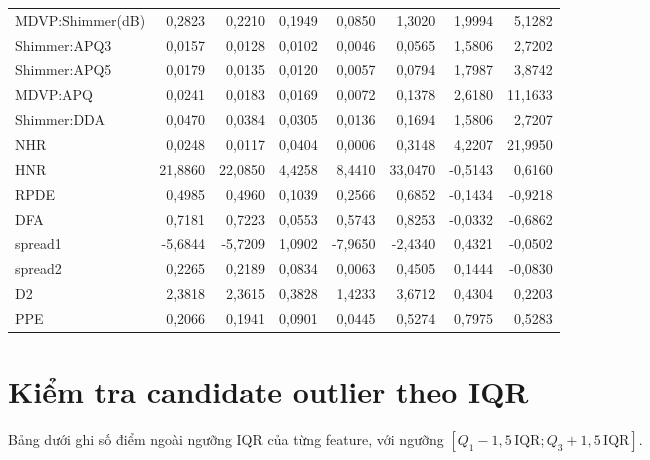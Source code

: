 \begin{longtable}{l r r r r r r r}
MDVP:Shimmer(dB) & 0{,}2823 & 0{,}2210 & 0{,}1949 & 0{,}0850 & 1{,}3020 & 1{,}9994 & 5{,}1282 \\
Shimmer:APQ3     & 0{,}0157 & 0{,}0128 & 0{,}0102 & 0{,}0046 & 0{,}0565 & 1{,}5806 & 2{,}7202 \\
Shimmer:APQ5     & 0{,}0179 & 0{,}0135 & 0{,}0120 & 0{,}0057 & 0{,}0794 & 1{,}7987 & 3{,}8742 \\
MDVP:APQ         & 0{,}0241 & 0{,}0183 & 0{,}0169 & 0{,}0072 & 0{,}1378 & 2{,}6180 & 11{,}1633 \\
Shimmer:DDA      & 0{,}0470 & 0{,}0384 & 0{,}0305 & 0{,}0136 & 0{,}1694 & 1{,}5806 & 2{,}7207 \\
NHR              & 0{,}0248 & 0{,}0117 & 0{,}0404 & 0{,}0006 & 0{,}3148 & 4{,}2207 & 21{,}9950 \\
HNR              & 21{,}8860 & 22{,}0850 & 4{,}4258 & 8{,}4410 & 33{,}0470 & -0{,}5143 & 0{,}6160 \\
RPDE             & 0{,}4985 & 0{,}4960 & 0{,}1039 & 0{,}2566 & 0{,}6852 & -0{,}1434 & -0{,}9218 \\
DFA              & 0{,}7181 & 0{,}7223 & 0{,}0553 & 0{,}5743 & 0{,}8253 & -0{,}0332 & -0{,}6862 \\
spread1          & -5{,}6844 & -5{,}7209 & 1{,}0902 & -7{,}9650 & -2{,}4340 & 0{,}4321 & -0{,}0502 \\
spread2          & 0{,}2265 & 0{,}2189 & 0{,}0834 & 0{,}0063 & 0{,}4505 & 0{,}1444 & -0{,}0830 \\
D2               & 2{,}3818 & 2{,}3615 & 0{,}3828 & 1{,}4233 & 3{,}6712 & 0{,}4304 & 0{,}2203 \\
PPE              & 0{,}2066 & 0{,}1941 & 0{,}0901 & 0{,}0445 & 0{,}5274 & 0{,}7975 & 0{,}5283 \\
\hline
\end{longtable}
\endgroup
{}

\section{Kiểm tra candidate outlier theo IQR}

Bảng dưới ghi số điểm ngoài ngưỡng IQR của từng feature, với ngưỡng
$[Q_1 - 1{,}5\,\text{IQR}; Q_3 + 1{,}5\,\text{IQR}]$.

